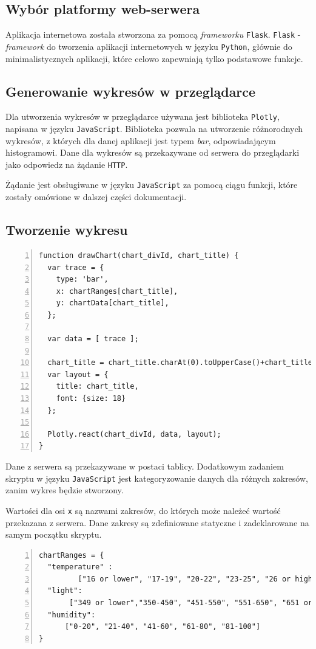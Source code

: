 \documentclass[a4paper]{article}
\begin{document}
        
        \subsection{Wybór platformy web-serwera}
	Aplikacja internetowa została stworzona za pomocą \textsl{frameworku} \texttt{Flask}. 
	\texttt{Flask} - \textsl{framework} do tworzenia aplikacji internetowych w języku \texttt{Python}, głównie do
	minimalistycznych aplikacji, które celowo zapewniają tylko podstawowe funkcje.
	
    \subsection{Generowanie wykresów w przeglądarce}
	Dla utworzenia wykresów w przeglądarce używana jest biblioteka \texttt{Plotly}, napisana w języku \texttt{JavaScript}.
	Biblioteka pozwala na utworzenie różnorodnych wykresów, z których dla danej aplikacji jest typem \textsl{bar}, odpowiadającym histogramowi. 
	Dane dla wykresów są przekazywane od serwera do przeglądarki jako odpowiedz na żądanie \texttt{HTTP}.

	Żądanie jest obsługiwane w języku \texttt{JavaScript} za pomocą ciągu funkcji, które zostały omówione w dalszej części dokumentacji.

    \subsection{Tworzenie wykresu}
    \begin{lstlisting}[frame=single, numbers=left, basicstyle=\ttfamily\small,
    caption={Funkcja do tworzenia histogramu za pomocą biblioteki \textsl{Plotly.js}}]
function drawChart(chart_divId, chart_title) {
  var trace = {
    type: 'bar',
    x: chartRanges[chart_title],
    y: chartData[chart_title],
  };

  var data = [ trace ];

  chart_title = chart_title.charAt(0).toUpperCase()+chart_title.slice(1);
  var layout = {
    title: chart_title,
    font: {size: 18}
  };

  Plotly.react(chart_divId, data, layout);
}
    \end{lstlisting}

    Dane z serwera są przekazywane w postaci tablicy. 
    Dodatkowym zadaniem skryptu w języku \texttt{JavaScript} jest kategoryzowanie danych
    dla różnych zakresów, zanim wykres będzie stworzony.

    \newpage
    Wartości dla osi \texttt{x} są nazwami zakresów, 
    do których może należeć wartość przekazana z serwera. 
    Dane zakresy są zdefiniowane statyczne i zadeklarowane na samym początku skryptu.
    \begin{lstlisting}[frame=single, numbers=left, basicstyle=\ttfamily\small,
caption={Zdefiniowany zakresy w skrypcie \texttt{JavaScript}}]
chartRanges = {
  "temperature" :
	     ["16 or lower", "17-19", "20-22", "23-25", "26 or higher"],
  "light": 
       ["349 or lower","350-450", "451-550", "551-650", "651 or higher"],
  "humidity":
	  ["0-20", "21-40", "41-60", "61-80", "81-100"]
}
    \end{lstlisting}
\end{document}
